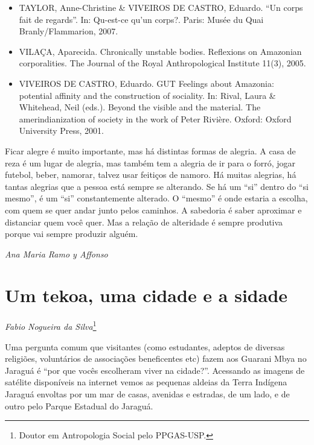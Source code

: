 \begin{itemize}
\item TAYLOR, Anne-Christine \& VIVEIROS DE CASTRO, Eduardo. ``Un corps
fait de regards''. In: Qu-est-ce qu’un corps?. Paris: Musée du Quai
Branly/Flammarion, 2007.

\item VILAÇA, Aparecida. Chronically unstable bodies. Reflexions on
Amazonian corporalities. The Journal of the Royal Anthropological
Institute 11(3), 2005.

\item VIVEIROS DE CASTRO, Eduardo. GUT Feelings about Amazonia:
potential affinity and the construction of sociality. In: Rival, Laura
\& Whitehead, Neil (eds.). Beyond the visible and the material. The
amerindianization of society in the work of Peter Rivière. Oxford:
Oxford University Press, 2001.
\end{itemize}

Ficar alegre é muito importante, mas há distintas formas de alegria. A
casa de reza é um lugar de alegria, mas também tem a alegria de ir para
o forró, jogar futebol, beber, namorar, talvez usar feitiços de namoro.
Há muitas alegrias, há tantas alegrias que a pessoa está sempre se
alterando. Se há um ``si'' dentro do ``si mesmo'', é um ``si'' constantemente
alterado. O ``mesmo'' é onde estaria a escolha, com quem se quer andar
junto pelos caminhos. A sabedoria é saber aproximar e distanciar quem
você quer. Mas a relação de alteridade é sempre produtiva porque vai
sempre produzir alguém.
\medskip
\begin{flushright}
\emph{Ana Maria Ramo y Affonso}
\end{flushright}

\chapter{Um tekoa, uma cidade e a sidade}
\begin{flushright}
\emph{Fabio Nogueira da Silva}\footnote{Doutor em Antropologia Social pelo
PPGAS-USP.}
\end{flushright}
\bigskip

Uma pergunta comum que visitantes (como estudantes, adeptos de diversas
religiões, voluntários de associações beneficentes etc) fazem aos
Guarani Mbya no Jaraguá é ``por que vocês escolheram viver na cidade?''.
Acessando as imagens de satélite disponíveis na internet vemos as
pequenas aldeias da Terra Indígena Jaraguá envoltas por um mar de
casas, avenidas e estradas, de um lado, e de outro pelo Parque Estadual
do Jaraguá. 

